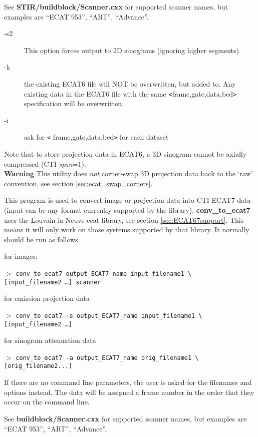 \documentclass{article}
\newcommand{\tab}{\hspace{5mm}}
\newcommand{\cmdline}[1]{\par \noindent $>$ \texttt{#1}\par}
\begin{document}
See \textbf{STIR/buildblock/Scanner.cxx} for supported scanner names, 
but examples are ``ECAT 953'', ``ART'', 
``Advance''. 


{ 
}\begin{description}
\item[-s2] This option forces output to 2D sinograms (ignoring higher 
segments).
\item[-k] the existing ECAT6 file will NOT be overwritten, but added 
to. Any existing data in the ECAT6 file with the same \texttt{<}frame,gate,data,bed\texttt{>} 
specification will be overwritten.
\item[-i] ask for \texttt{<} frame,gate,data,bed\texttt{>} for each dataset
\end{description}

Note that to store projection data in ECAT6, a 3D sinogram cannot 
be axially compressed (CTI \textit{span}=1).\\
\textbf{Warning} This utility does \textit{not} corner-swap 3D projection 
data back to the `raw' convention, see section \ref{sec:ecat_swap_corners}.

{ 
}

This program is used to convert image or projection data into 
CTI ECAT7 data (input can be any format currently supported by 
the library). \textbf{conv\_to\_ecat7} uses the Louvain la Neuve ecat 
library, see section \ref{sec:ECAT67support}. This means it will only work on those 
systems supported by that library. It normally should be run 
as follows


for images:
\cmdline{conv\_to\_ecat7 output\_ECAT7\_name input\_filename1 {\textbackslash}\\
{[}input\_filename2 \dots ] scanner}


for emission projection data
\cmdline{conv\_to\_ecat7 --s output\_ECAT7\_name input\_filename1 {\textbackslash}\\
{[}input\_filename2 \dots ]\tab  }


for sinogram-attenuation data
\cmdline{conv\_to\_ecat7 -a output\_ECAT7\_name orig\_filename1 {\textbackslash}\\
{[}orig\_filename2...]}


If there are no command line parameters, the user is asked for 
the filenames and options instead. The data will be assigned 
a frame number in the order that they occur on the command line.


See \textbf{buildblock/Scanner.cxx} for supported scanner names, but 
examples are ``ECAT 953'', ``ART'', ``Advance''. 
\end{document}
